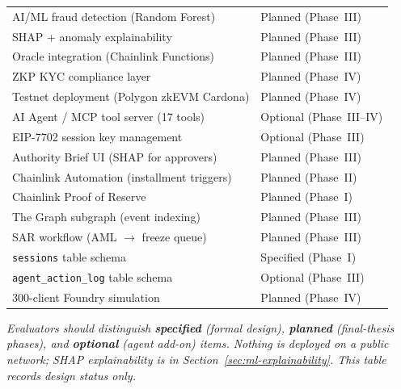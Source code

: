 \documentclass[12pt,a4paper]{report}
\newcommand{\tmarkPartial}{\faHourglassHalf}
\newcommand{\tmarkPlanned}{\textcolor{black!55}{\faCircle}}
\begin{document}
\begin{table}[H]
\begin{tabular}{@{}p{7.1cm}>{\raggedleft\arraybackslash}p{5.9cm}@{}}
\rowcolor{RowShade}
AI/ML fraud detection (Random Forest) & \tmarkPlanned{} Planned (Phase~III) \\
SHAP + anomaly explainability & \tmarkPlanned{} Planned (Phase~III) \\
\rowcolor{RowShade}
Oracle integration (Chainlink Functions) & \tmarkPlanned{} Planned (Phase~III) \\
ZKP KYC compliance layer & \tmarkPlanned{} Planned (Phase~IV) \\
\rowcolor{RowShade}
Testnet deployment (Polygon zkEVM Cardona) & \tmarkPlanned{} Planned (Phase~IV) \\
AI Agent / MCP tool server (17 tools) & \tmarkPlanned{} Optional (Phase~III--IV) \\
\rowcolor{RowShade}
EIP-7702 session key management & \tmarkPlanned{} Optional (Phase~III) \\
Authority Brief UI (SHAP for approvers) & \tmarkPlanned{} Planned (Phase~III) \\
\rowcolor{RowShade}
Chainlink Automation (installment triggers) & \tmarkPlanned{} Planned (Phase~II) \\
Chainlink Proof of Reserve & \tmarkPlanned{} Planned (Phase~I) \\
\rowcolor{RowShade}
The Graph subgraph (event indexing) & \tmarkPlanned{} Planned (Phase~III) \\
SAR workflow (AML $\to$ freeze queue) & \tmarkPlanned{} Planned (Phase~III) \\
\rowcolor{RowShade}
\texttt{sessions} table schema & \tmarkPartial{} Specified (Phase~I) \\
\texttt{agent\_action\_log} table schema & \tmarkPlanned{} Optional (Phase~III) \\
\rowcolor{RowShade}
300-client Foundry simulation & \tmarkPlanned{} Planned (Phase~IV) \\
\bottomrule
\end{tabular}
\end{table}

\noindent\textit{\small Evaluators should distinguish \textbf{specified} (formal design), \textbf{planned} (final-thesis phases), and \textbf{optional} (agent add-on) items. Nothing is deployed on a public network; SHAP explainability is in Section~\ref{sec:ml-explainability}. This table records design status only.}
\end{document}
